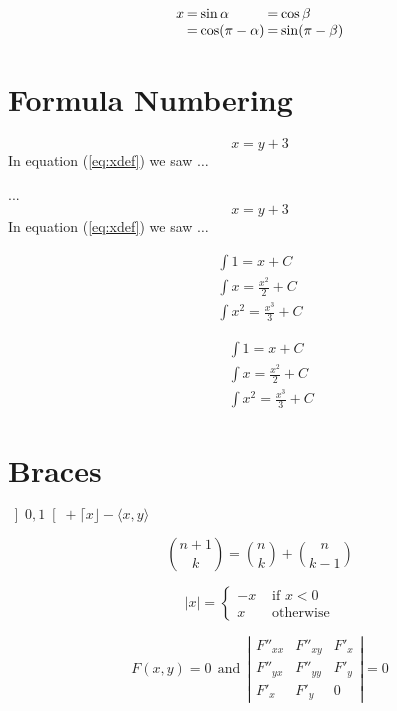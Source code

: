 \documentclass{article}
\begin{document}
$$\setlength\arraycolsep{0.1em}
 \begin{array}{rclcl}
  x&=&\sin \alpha &=& \cos \beta\\
   &=&\cos(\pi-\alpha) &=& \sin(\pi-\beta)
 \end{array}
$$

\section{Formula Numbering}

\begin{equation} x=y+3 \label{eq:xdef}
\end{equation}
In equation (\ref{eq:xdef}) we saw $\dots$


...
\begin{equation} x=y+3 \label{eq:xdef}
\end{equation}
In equation (\ref{eq:xdef}) we saw $\dots$

\begin{equation}
\begin{array}{l}
\displaystyle \int 1 = x + C\\
\displaystyle \int x = \frac{x^2}{2} + C \\
\displaystyle \int x^2 = \frac{x^3}{3} + C
\end{array} 
\label{eq:xdef}
\end{equation}

\begin{eqnarray}
&& \int 1 = x + C \nonumber\\
&& \int x = \frac{x^2}{2} + C \nonumber\\
&& \int x^2 = \frac{x^3}{3} + C \label{eq:xdef}
\end{eqnarray}

\section{Braces}

$\left] 0,1
\right[
 + \lceil x \rfloor - \langle x,y\rangle$
 
$$
{n+1\choose k} = {n\choose k} + {n \choose k-1}
$$

$$
|x| = \left\{ \begin{array}{rl}
 -x &\mbox{ if $x<0$} \\
  x &\mbox{ otherwise}
       \end{array} \right.
$$

$$
F(x,y)=0 ~~\mbox{and}~~
\left| \begin{array}{ccc}
  F''_{xx} & F''_{xy} &  F'_x \\
  F''_{yx} & F''_{yy} &  F'_y \\
  F'_x     & F'_y     & 0 
  \end{array}\right| = 0
$$
\end{document}
